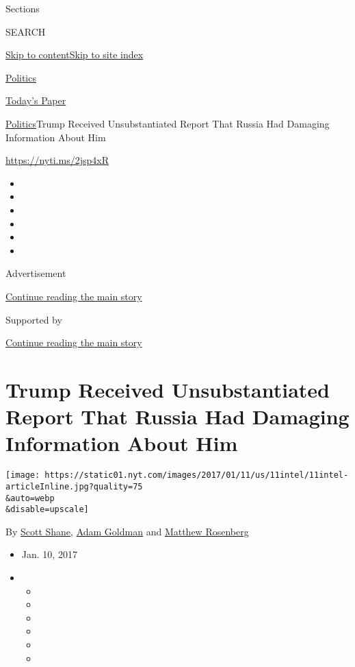 Sections

SEARCH

\protect\hyperlink{site-content}{Skip to
content}\protect\hyperlink{site-index}{Skip to site index}

\href{https://www.nytimes.com/section/politics}{Politics}

\href{https://myaccount.nytimes.com/auth/login?response_type=cookie\&client_id=vi}{}

\href{https://www.nytimes.com/section/todayspaper}{Today's Paper}

\href{/section/politics}{Politics}\textbar{}Trump Received
Unsubstantiated Report That Russia Had Damaging Information About Him

\url{https://nyti.ms/2jsp4xR}

\begin{itemize}
\item
\item
\item
\item
\item
\item
\end{itemize}

Advertisement

\protect\hyperlink{after-top}{Continue reading the main story}

Supported by

\protect\hyperlink{after-sponsor}{Continue reading the main story}

\hypertarget{trump-received-unsubstantiated-report-that-russia-had-damaging-information-about-him}{%
\section{Trump Received Unsubstantiated Report That Russia Had Damaging
Information About
Him}\label{trump-received-unsubstantiated-report-that-russia-had-damaging-information-about-him}}

\texttt{[image: https://static01.nyt.com/images/2017/01/11/us/11intel/11intel-articleInline.jpg?quality=75\\\&auto=webp\\\&disable=upscale]}

By \href{http://www.nytimes.com/by/scott-shane}{Scott Shane},
\href{https://www.nytimes.com/by/adam-goldman}{Adam Goldman} and
\href{http://www.nytimes.com/by/matthew-rosenberg}{Matthew Rosenberg}

\begin{itemize}
\item
  Jan. 10, 2017
\item
  \begin{itemize}
  \item
  \item
  \item
  \item
  \item
  \item
  \end{itemize}
\end{itemize}

